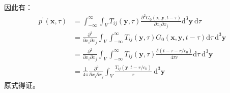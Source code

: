 \begin{enumerate}
\begin{equation}
    \end{equation}
    因此有：
    \begin{equation}
        \begin{aligned}
            p^{\prime}(\mathbf{x},\tau) 
            &= \int_{-\infty}^{\infty} \int_{V} T_{i j}(\mathbf{y},\tau) \frac{\partial^{2} G_{0}(\mathbf{x},\mathbf{y},t-\tau)}{\partial x_{i} \partial x_{j}} \mathrm{d}^{3} \mathbf{y} \mathrm{~d} \tau \\
            &= \frac{\partial^{2}}{\partial x_{i} \partial x_{j}} \int_{V} \int_{-\infty}^{\infty} T_{i j}(\mathbf{y},\tau)  G_{0}(\mathbf{x},\mathbf{y},t-\tau) \mathrm{d} \tau \mathrm{~d}^{3} \mathbf{y} \\
            &= \frac{\partial^{2}}{\partial x_{i} \partial x_{j}} \int_{V} \int_{-\infty}^{\infty} T_{i j}(\mathbf{y},\tau)  \frac{\delta(t - \tau - r/c_{0})}{4 \pi r} \mathrm{d} \tau \mathrm{~d}^{3} \mathbf{y} \\
            &= \frac{1}{4 \pi} \frac{\partial^{2}}{\partial x_{i} \partial x_{j}} \int_{V} \frac{T_{i j}\left(\mathbf{y}, t-r / c_{0}\right)}{r} \mathrm{~d}^{3} \mathbf{y}
        \end{aligned}
    \end{equation}
    原式得证。
\end{enumerate}

\clearpage